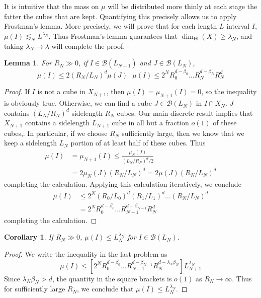 \documentclass{article}
\theoremstyle{plain}
\newtheorem{lemma}{Lemma}
\newtheorem*{corollary}{Corollary}
\theoremstyle{plain}
\begin{document}
\begin{multicols}{2}
It is intuitive that the mass on $\mu$ will be distributed more thinly at each stage the fatter the cubes that are kept. Quantifying this precisely allows us to apply Frostman's lemma. More precisely, we will prove that for each length $L$ interval $I$, $\mu(I) \lesssim_N L^{\lambda_N}$. Thus Frostman's lemma guarantees that $\dim_{\mathbf{H}}(X) \geq \lambda_N$, and taking $\lambda_N \to \lambda$ will complete the proof.

\begin{lemma}
	For $R_N \gg 0$, if $I \in \mathcal{B}(L_{N+1})$ and $J \in \mathcal{B}(L_N)$,
	\[ \mu(I) \leq 2 (R_N/L_N)^d \mu(J)\ \ \ \mu(I) \leq 2^N R_0^{d - \beta_0} \dots R_N^{d - \beta_N} R_N^d \]
\end{lemma}
\begin{proof}
	If $I$ is not a cube in $X_{N+1}$, then $\mu(I) = \mu_{N+1}(I) = 0$, so the inequality is obviously true. Otherwise, we can find a cube $J \in \mathcal{B}(L_N)$ in $I \cap X_N$. $J$ contains $(L_N/R_N)^d$ sidelength $R_N$ cubes. Our main discrete result implies that $X_{N+1}$ contains a sidelength $L_{N+1}$ cube in all but a fraction $o(1)$ of these cubes,. In particular, if we choose $R_N$ sufficiently large, then we know that we keep a sidelength $L_N$ portion of at least half of these cubes. Thus
	\begin{align*}
		\mu(I) &= \mu_{N+1}(I) \leq \frac{\mu_N(J)}{(L_N/R_N)^d/2}\\
		&= 2 \mu_N(J) (R_N/L_N)^d = 2 \mu(J) (R_N/L_N)^d
	\end{align*}
	completing the calculation. Applying this calculation iteratively, we conclude
	\begin{align*}
		\mu(I) &\leq 2^N (R_0/L_0)^d (R_1/L_1)^d \dots (R_N/L_N)^d\\
		&= 2^N R_0^{d - \beta_0} \dots R_{N-1}^{d - \beta_{N-1}} R_N^d
	\end{align*}
	completing the calculation.
\end{proof}

\begin{corollary}
	If $R_N \gg 0$, $\mu(I) \leq L_N^{\lambda_N}$ for $I \in \mathcal{B}(L_N)$.
\end{corollary}
\begin{proof}
	We write the inequality in the last problem as
	\[ \mu(I) \leq [2^N R_0^{d - \beta_0} \dots R_{N-1}^{d - \beta_{N-1}} R_N^{d - \lambda_N \beta_N}] L_{N+1}^{\lambda_N} \]
	Since $\lambda_N \beta_N > d$, the quantity in the square brackets is $o(1)$ as $R_N \to \infty$. Thus for sufficiently large $R_N$, we conclude that $\mu(I) \leq L_N^{\lambda_N}$.
\end{proof}


\end{multicols}
\end{document}
